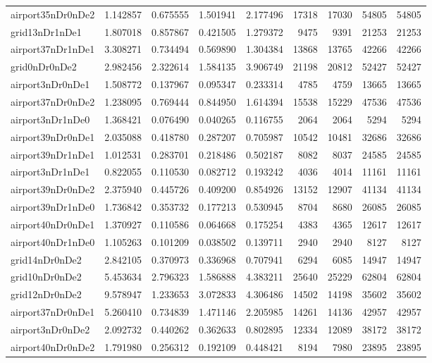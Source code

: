 \begin{longtable}{|l|r|r|r|r|r|r|r|r|}
airport35nDr0nDe2 & 1.142857 & 0.675555 & 1.501941 & 2.177496 & 17318 & 17030 & 54805 & 54805 \\
grid13nDr1nDe1 & 1.807018 & 0.857867 & 0.421505 & 1.279372 & 9475 & 9391 & 21253 & 21253 \\
airport37nDr1nDe1 & 3.308271 & 0.734494 & 0.569890 & 1.304384 & 13868 & 13765 & 42266 & 42266 \\
grid0nDr0nDe2 & 2.982456 & 2.322614 & 1.584135 & 3.906749 & 21198 & 20812 & 52427 & 52427 \\
airport3nDr0nDe1 & 1.508772 & 0.137967 & 0.095347 & 0.233314 & 4785 & 4759 & 13665 & 13665 \\
airport37nDr0nDe2 & 1.238095 & 0.769444 & 0.844950 & 1.614394 & 15538 & 15229 & 47536 & 47536 \\
airport3nDr1nDe0 & 1.368421 & 0.076490 & 0.040265 & 0.116755 & 2064 & 2064 & 5294 & 5294 \\
airport39nDr0nDe1 & 2.035088 & 0.418780 & 0.287207 & 0.705987 & 10542 & 10481 & 32686 & 32686 \\
airport39nDr1nDe1 & 1.012531 & 0.283701 & 0.218486 & 0.502187 & 8082 & 8037 & 24585 & 24585 \\
airport3nDr1nDe1 & 0.822055 & 0.110530 & 0.082712 & 0.193242 & 4036 & 4014 & 11161 & 11161 \\
airport39nDr0nDe2 & 2.375940 & 0.445726 & 0.409200 & 0.854926 & 13152 & 12907 & 41134 & 41134 \\
airport39nDr1nDe0 & 1.736842 & 0.353732 & 0.177213 & 0.530945 & 8704 & 8680 & 26085 & 26085 \\
airport40nDr0nDe1 & 1.370927 & 0.110586 & 0.064668 & 0.175254 & 4383 & 4365 & 12617 & 12617 \\
airport40nDr1nDe0 & 1.105263 & 0.101209 & 0.038502 & 0.139711 & 2940 & 2940 & 8127 & 8127 \\
grid14nDr0nDe2 & 2.842105 & 0.370973 & 0.336968 & 0.707941 & 6294 & 6085 & 14947 & 14947 \\
grid10nDr0nDe2 & 5.453634 & 2.796323 & 1.586888 & 4.383211 & 25640 & 25229 & 62804 & 62804 \\
grid12nDr0nDe2 & 9.578947 & 1.233653 & 3.072833 & 4.306486 & 14502 & 14198 & 35602 & 35602 \\
airport37nDr0nDe1 & 5.260410 & 0.734839 & 1.471146 & 2.205985 & 14261 & 14136 & 42957 & 42957 \\
airport3nDr0nDe2 & 2.092732 & 0.440262 & 0.362633 & 0.802895 & 12334 & 12089 & 38172 & 38172 \\
airport40nDr0nDe2 & 1.791980 & 0.256312 & 0.192109 & 0.448421 & 8194 & 7980 & 23895 & 23895 \\

\end{longtable}
